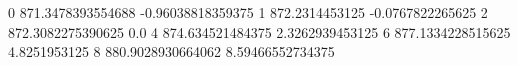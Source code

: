 0 871.3478393554688 -0.96038818359375
1 872.2314453125 -0.0767822265625
2 872.3082275390625 0.0
4 874.634521484375 2.3262939453125
6 877.1334228515625 4.8251953125
8 880.9028930664062 8.59466552734375
